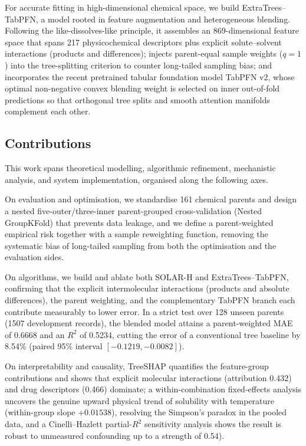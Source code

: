 For accurate fitting in high-dimensional chemical space, we build ExtraTrees--TabPFN, a model rooted in feature augmentation and heterogeneous blending. Following the like-dissolves-like principle, it assembles an 869-dimensional feature space that spans 217 physicochemical descriptors plus explicit solute--solvent interactions (products and differences)\cite{boobier2020}; injects parent-equal sample weights ($q=1$) into the tree-splitting criterion to counter long-tailed sampling bias\cite{extratrees2006}; and incorporates the recent pretrained tabular foundation model TabPFN v2\cite{tabpfn2025}, whose optimal non-negative convex blending weight is selected on inner out-of-fold predictions so that orthogonal tree splits and smooth attention manifolds complement each other.

\subsection{Contributions}

This work spans theoretical modelling, algorithmic refinement, mechanistic analysis, and system implementation, organised along the following axes.

On evaluation and optimisation, we standardise 161 chemical parents and design a nested five-outer/three-inner parent-grouped cross-validation (Nested GroupKFold) that prevents data leakage\cite{leakage2023,varma2006}, and we define a parent-weighted empirical risk together with a sample reweighting function, removing the systematic bias of long-tailed sampling from both the optimisation and the evaluation sides.

On algorithms, we build and ablate both SOLAR-H and ExtraTrees--TabPFN, confirming that the explicit intermolecular interactions (products and absolute differences), the parent weighting, and the complementary TabPFN branch each contribute measurably to lower error. In a strict test over 128 unseen parents (1507 development records), the blended model attains a parent-weighted MAE of 0.6668 and an $R^2$ of 0.5234, cutting the error of a conventional tree baseline by 8.54\% (paired 95\% interval $[-0.1219, -0.0082]$\cite{extratrees2006,tabpfn2025}).

On interpretability and causality, TreeSHAP quantifies the feature-group contributions and shows that explicit molecular interactions (attribution 0.432) and drug descriptors (0.466) dominate\cite{treeshap2020}; a within-combination fixed-effects analysis uncovers the genuine upward physical trend of solubility with temperature (within-group slope $+0.01538$), resolving the Simpson's paradox in the pooled data, and a Cinelli--Hazlett partial-$R^2$ sensitivity analysis shows the result is robust to unmeasured confounding up to a strength of 0.54\cite{pearl2009,sensitivity2020}).

